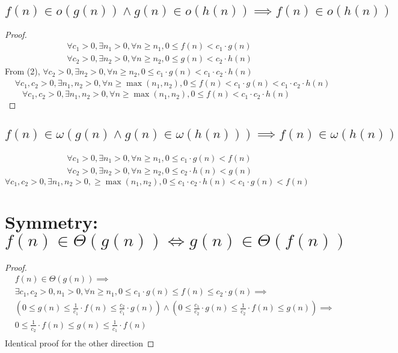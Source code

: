 \documentclass{article}
\begin{document}
\subsection{$f(n) \in o(g(n)) \land g(n) \in o(h(n)) \implies f(n) \in o(h(n))$}
\begin{proof}
    \begin{align}
        &\forall c_1 > 0, \exists n_1 > 0, \forall n \geq n_1, 0 \leq f(n) < c_1 \cdot g(n)\\
        &\forall c_2 > 0, \exists n_2 > 0, \forall n \geq n_2, 0 \leq g(n) < c_2 \cdot h(n)
    \end{align}
From  (2), $\forall c_2 > 0, \exists n_2 > 0, \forall n \geq n_2, 0 \leq c_1 \cdot g(n) < c_1 \cdot c_2 \cdot h(n)$
    \begin{align*}
        &\forall c_1, c_2 > 0, \exists n_1, n_2 > 0, \forall n \geq \max(n_1, n_2), 0 \leq f(n) < c_1 \cdot g(n) < c_1 \cdot c_2 \cdot h(n)
    \end{align*}
    \[\forall c_1, c_2 > 0, \exists n_1, n_2 > 0, \forall n \geq \max(n_1, n_2), 0 \leq f(n) < c_1 \cdot c_2 \cdot h(n)\]
\end{proof}

\subsection{$f(n) \in \omega(g(n) \land g(n) \in \omega(h(n))) \implies f(n) \in \omega(h(n))$}
    \begin{align*}
        &\forall c_1 > 0, \exists n_1 > 0, \forall n \geq n_1, 0 \leq c_1 \cdot g(n) < f(n)\\
        &\forall c_2 > 0, \exists n_2 > 0, \forall n \geq n_2, 0 \leq c_2 \cdot h(n) < g(n)
    \end{align*}
    \[\forall c_1, c_2 > 0, \exists n_1, n_2 > 0, \geq \max(n_1, n_2), 0 \leq c_1 \cdot c_2 \cdot h(n) < c_1 \cdot g(n) < f(n)\]
\section{Symmetry: $f(n) \in \Theta(g(n)) \iff g(n)\in \Theta(f(n))$}
\begin{proof}
    \begin{align*}
        & f(n) \in \Theta(g(n)) \implies\\
        &\exists c_1, c_2> 0, n_1 > 0, \forall n \geq n_1, 0 \leq c_1 \cdot g(n) \leq f(n) \leq c_2 \cdot g(n) \implies\\
        & \left(0 \leq g(n) \leq \frac{1}{c_1}\cdot f(n) \leq \frac{c_2}{c_1}\cdot g(n)\right) \land \left( 0 \leq \frac{c_1}{c_2} \cdot g(n) \leq \frac{1}{c_2} \cdot f(n) \leq g(n)\right) \implies \\
        & 0 \leq \frac{1}{c_2} \cdot f(n) \leq g(n) \leq \frac{1}{c_1}\cdot f(n)\\
    \end{align*}
    Identical proof for the other direction
\end{proof}
\end{document}
